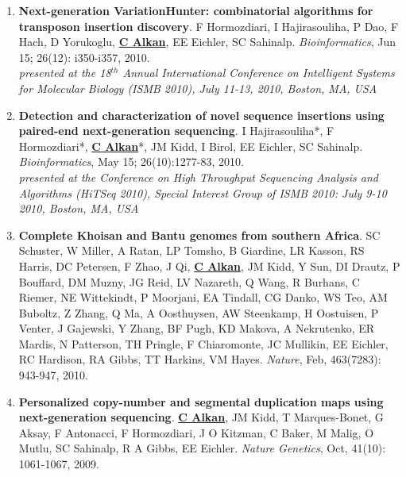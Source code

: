 \begin{enumerate}
\item
{\bf Next-generation VariationHunter: combinatorial algorithms for transposon insertion discovery}.
F Hormozdiari, I Hajirasouliha, P Dao, F Hach, D Yorukoglu, {\bf {\underline{C Alkan}}},
 EE Eichler, SC Sahinalp.
{\em Bioinformatics}, Jun 15;  26(12): i350-i357, 2010. \\
\hspace*{1cm} {\footnotesize {\em presented at the 18$^{th}$ Annual International Conference on Intelligent Systems
for Molecular Biology (ISMB 2010), July 11-13, 2010, Boston, MA, USA}}



\item
{\bf Detection and characterization of novel sequence insertions using paired-end next-generation sequencing}.
 I Hajirasouliha*, F Hormozdiari*, {\bf {\underline{C Alkan}}}*, JM Kidd, I Birol, EE Eichler,
 SC Sahinalp.
{\em Bioinformatics}, May 15; 26(10):1277-83, 2010. \\
\hspace*{1cm} {\footnotesize {\em presented at the Conference on High Throughput Sequencing Analysis and Algorithms (HiTSeq 2010), 
    Special Interest Group of ISMB 2010: July 9-10 2010, Boston, MA, USA}}

\clearpage

\item
{\bf Complete Khoisan and Bantu genomes from southern Africa}.
 SC Schuster, W Miller, A Ratan, LP Tomsho, B Giardine, LR Kasson, RS
 Harris, DC Petersen, F Zhao, J Qi, {\bf \underline{C Alkan}}, JM Kidd, Y Sun, DI Drautz, 
P Bouffard, DM Muzny, JG Reid, LV Nazareth, Q Wang, R Burhans, C Riemer, 
NE Wittekindt, P Moorjani, EA Tindall, CG Danko, WS Teo, AM Buboltz, 
Z Zhang, Q Ma, A Oosthuysen, AW Steenkamp, H Oostuisen, P Venter, J 
Gajewski, Y Zhang, BF Pugh, KD Makova, A Nekrutenko, ER Mardis, N Patterson, 
TH Pringle, F Chiaromonte, JC Mullikin, EE Eichler, RC Hardison, RA Gibbs, TT 
Harkins, VM Hayes. 
{\em Nature}, Feb, 463(7283): 943-947, 2010.

\item
{\bf Personalized copy-number and segmental duplication maps using next-generation sequencing}.
{\bf {\underline{C Alkan}}}, JM Kidd, T Marques-Bonet, G Aksay, F Antonacci, F Hormozdiari, J O Kitzman, 
C Baker, M Malig, O Mutlu, SC Sahinalp, R A Gibbs, EE Eichler.  
{\em Nature Genetics},  Oct, 41(10): 1061-1067, 2009.\\



\end{enumerate}
